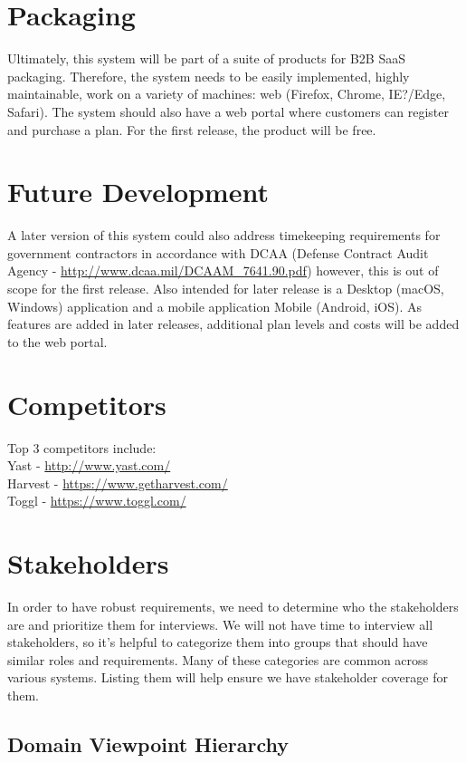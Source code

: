 \documentclass[12pt]{article}
\begin{document}
\section{Packaging}

Ultimately, this system will be part of a suite of products for B2B SaaS packaging.  Therefore, the system needs to be easily implemented, highly maintainable, work on a variety of machines: web (Firefox, Chrome, IE?/Edge, Safari).  The system should also have a web portal where customers can register and purchase a plan.  For the first release, the product will be free.

\section{Future Development}

A later version of this system could also address timekeeping requirements for government contractors in accordance with DCAA (Defense Contract Audit Agency - \url{http://www.dcaa.mil/DCAAM_7641.90.pdf}) however, this is out of scope for the first release.  Also intended for later release is a Desktop (macOS, Windows) application and a mobile application Mobile (Android, iOS).  As features are added in later releases, additional plan levels and costs will be added to the web portal.

\section{Competitors}

Top 3 competitors include:\\
Yast - \url{http://www.yast.com/}\\
Harvest - \url{https://www.getharvest.com/}\\
Toggl - \url{https://www.toggl.com/}

\section{Stakeholders}

In order to have robust requirements, we need to determine who the stakeholders are and prioritize them for interviews. We will not have time to interview all stakeholders, so it’s helpful to categorize them into groups that should have similar roles and requirements. Many of these categories are common across various systems. Listing them will help ensure we have stakeholder coverage for them.

\subsection{Domain Viewpoint Hierarchy}
\end{document}
